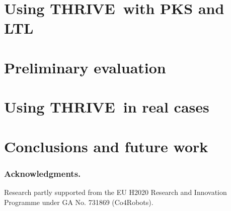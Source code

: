 \documentclass[runningheads,a4paper]{llncs}
\newcommand{\NAME}{THRIVE}
\begin{document}
\section{Using \NAME\ with PKS and LTL}
\label{sec:theoremProverAdapting}

%

\section{Preliminary evaluation}
\label{sec:preliminaryEvaluation}


\section{Using \NAME\ in real cases}
\label{sec:discussion}


%


\section{Conclusions and future work}
\label{sec:conclusions}



\subsubsection*{Acknowledgments.} 
Research partly supported from the EU H2020 Research and
Innovation Programme under GA No. 731869 (Co4Robots).


 
\end{document}
